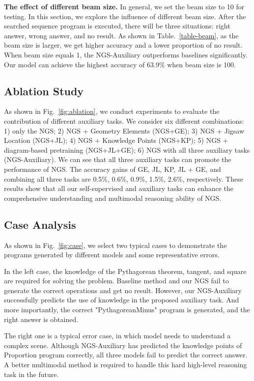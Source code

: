 \documentclass[11pt,a4paper]{article}
\begin{document}
\textbf{The effect of different beam size. }
In general, we set the beam size to 10 for testing. 
In this section, we explore the influence of different beam size.
After the searched sequence program is executed, there will be three situations: right answer, wrong answer, and no result. 
As shown in Table.~\ref{table-beam}, as the beam size is larger, we get higher accuracy and a lower proportion of no result. When beam size equals 1, the  NGS-Auxiliary outperforms baselines significantly. Our model can achieve the highest accuracy of 63.9\%  when beam size is 100. 

\subsection{Ablation Study}
As shown in Fig.~\ref{fig:ablation}, we conduct experiments to evaluate the contribution of different auxiliary tasks. We consider six different combinations: 1) only the NGS; 2) NGS + Geometry Elements (NGS+GE); 3) NGS + Jigsaw Location (NGS+JL);  4) NGS + Knowledge Points (NGS+KP); 5) NGS + diagram-based pretraining (NGS+JL+GE); 6) NGS with all three auxiliary tasks (NGS-Auxiliary).
We can see that all three auxiliary tasks can promote the performance of NGS. The accuracy gains of GE, JL, KP, JL + GE, and combining all three tasks are 0.5\%, 0.6\%, 0.9\%, 1.5\%, 2.6\%, respectively. 
These results show that all our self-supervised and auxiliary tasks can enhance the comprehensive understanding and multimodal reasoning ability of NGS. 


\subsection{Case Analysis}
As shown in Fig.~\ref{fig:case}, we select two typical cases to demonstrate the programs generated by different models and some representative errors. 

In the left case, the knowledge of the Pythagorean theorem, tangent, and square are required for solving the problem. 
Baseline method and our NGS fail to generate the correct operations and get no result. 
However, our NGS-Auxiliary successfully predicts the use of knowledge in the proposed auxiliary task. And more importantly, the correct "PythagoreanMinus" program is generated, and the right answer is obtained. 

The right one is a typical error case, in which model needs to understand a  complex scene. Although NGS-Auxiliary has predicted the knowledge points of Proportion program correctly, all three models fail to predict the correct answer. A better multimodal method is required to handle this hard high-level reasoning task in the future.
\end{document}
